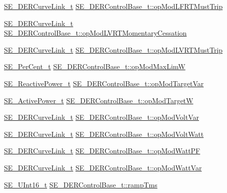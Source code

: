 \begin{DoxyCompactItemize}
\hyperlink{structSE__DERCurveLink__t}{S\+E\+\_\+\+D\+E\+R\+Curve\+Link\+\_\+t} \hyperlink{group__DERControlBase_ga358ba75007797cfce59e113e52eac3d8}{S\+E\+\_\+\+D\+E\+R\+Control\+Base\+\_\+t\+::op\+Mod\+L\+F\+R\+T\+Must\+Trip}
\item 
\hyperlink{structSE__DERCurveLink__t}{S\+E\+\_\+\+D\+E\+R\+Curve\+Link\+\_\+t} \hyperlink{group__DERControlBase_ga2741d46500aa811e2ed79fe29493729a}{S\+E\+\_\+\+D\+E\+R\+Control\+Base\+\_\+t\+::op\+Mod\+L\+V\+R\+T\+Momentary\+Cessation}
\item 
\hyperlink{structSE__DERCurveLink__t}{S\+E\+\_\+\+D\+E\+R\+Curve\+Link\+\_\+t} \hyperlink{group__DERControlBase_ga53df2db63947a75e9d4a8b83ee434cf7}{S\+E\+\_\+\+D\+E\+R\+Control\+Base\+\_\+t\+::op\+Mod\+L\+V\+R\+T\+Must\+Trip}
\item 
\hyperlink{group__PerCent_ga14278cbee754c63496035b722b417ddc}{S\+E\+\_\+\+Per\+Cent\+\_\+t} \hyperlink{group__DERControlBase_ga926fba7f7db0a007f7a5dbfeca61840a}{S\+E\+\_\+\+D\+E\+R\+Control\+Base\+\_\+t\+::op\+Mod\+Max\+LimW}
\item 
\hyperlink{structSE__ReactivePower__t}{S\+E\+\_\+\+Reactive\+Power\+\_\+t} \hyperlink{group__DERControlBase_gacb1af6bfe16eeb2f8653a1ba5e5bb8d1}{S\+E\+\_\+\+D\+E\+R\+Control\+Base\+\_\+t\+::op\+Mod\+Target\+Var}
\item 
\hyperlink{structSE__ActivePower__t}{S\+E\+\_\+\+Active\+Power\+\_\+t} \hyperlink{group__DERControlBase_ga1ff79302fcc3539736e4be0799aa66f4}{S\+E\+\_\+\+D\+E\+R\+Control\+Base\+\_\+t\+::op\+Mod\+TargetW}
\item 
\hyperlink{structSE__DERCurveLink__t}{S\+E\+\_\+\+D\+E\+R\+Curve\+Link\+\_\+t} \hyperlink{group__DERControlBase_gac20fb88b06cf1190d01a1fd5ae20c52a}{S\+E\+\_\+\+D\+E\+R\+Control\+Base\+\_\+t\+::op\+Mod\+Volt\+Var}
\item 
\hyperlink{structSE__DERCurveLink__t}{S\+E\+\_\+\+D\+E\+R\+Curve\+Link\+\_\+t} \hyperlink{group__DERControlBase_ga365b1200843285bc313d91791fe583b5}{S\+E\+\_\+\+D\+E\+R\+Control\+Base\+\_\+t\+::op\+Mod\+Volt\+Watt}
\item 
\hyperlink{structSE__DERCurveLink__t}{S\+E\+\_\+\+D\+E\+R\+Curve\+Link\+\_\+t} \hyperlink{group__DERControlBase_ga15ce5a47c11d47a3e75630e935b0cd65}{S\+E\+\_\+\+D\+E\+R\+Control\+Base\+\_\+t\+::op\+Mod\+Watt\+PF}
\item 
\hyperlink{structSE__DERCurveLink__t}{S\+E\+\_\+\+D\+E\+R\+Curve\+Link\+\_\+t} \hyperlink{group__DERControlBase_gafbb4008251d74dc443b9ad4279bee1d1}{S\+E\+\_\+\+D\+E\+R\+Control\+Base\+\_\+t\+::op\+Mod\+Watt\+Var}
\item 
\hyperlink{group__UInt16_gac68d541f189538bfd30cfaa712d20d29}{S\+E\+\_\+\+U\+Int16\+\_\+t} \hyperlink{group__DERControlBase_ga69b8b3789a6a21ee8b6e718340dce614}{S\+E\+\_\+\+D\+E\+R\+Control\+Base\+\_\+t\+::ramp\+Tms}
\end{DoxyCompactItemize}


